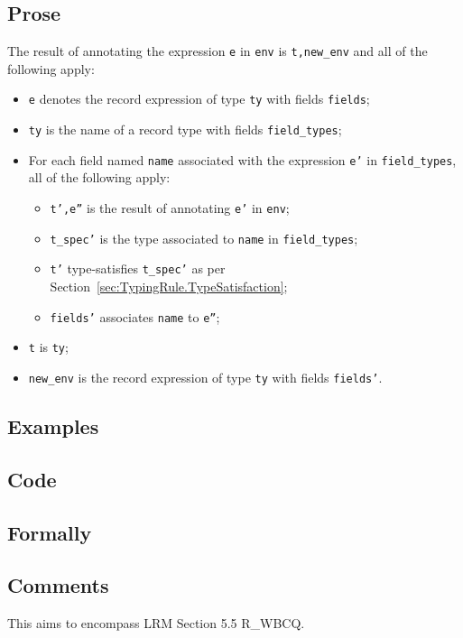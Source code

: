 \documentclass{book}
\begin{document}
  \subsection{Prose}
  The result of annotating the expression \texttt{e} in \texttt{env} is
\texttt{t,new\_env} and all of the following apply:
  \begin{itemize}
  \item \texttt{e} denotes the record expression of type \texttt{ty} with fields \texttt{fields};
  \item \texttt{ty} is the name of a record type with fields \texttt{field\_types};
  \item For each field named \texttt{name} associated with the expression \texttt{e'} in
    \texttt{field\_types}, all of the following apply:
    \begin{itemize}
    \item \texttt{t',e''} is the result of annotating \texttt{e'} in \texttt{env};
    \item \texttt{t\_spec'} is the type associated to \texttt{name} in \texttt{field\_types};
    \item \texttt{t'} type-satisfies \texttt{t\_spec'} as per Section~\ref{sec:TypingRule.TypeSatisfaction};
    \item \texttt{fields'} associates \texttt{name} to \texttt{e''};
    \end{itemize}
  \item \texttt{t} is \texttt{ty};
  \item \texttt{new\_env} is the record expression of type \texttt{ty} with fields \texttt{fields'}.
  \end{itemize}

  \subsection{Examples}

  \subsection{Code}

  \subsection{Formally}

  \subsection{Comments}
  This aims to encompass LRM Section 5.5 R\_WBCQ.
\end{document}
